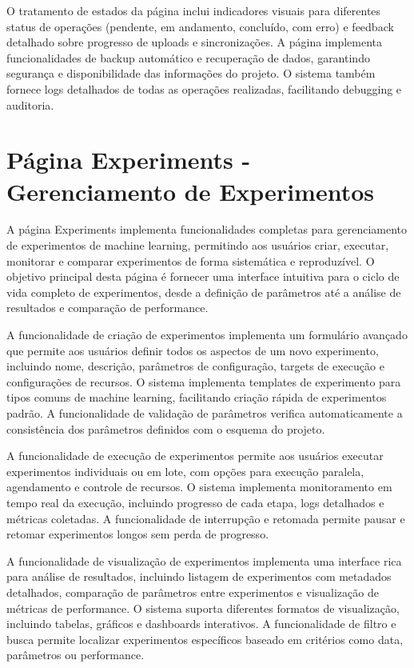 \documentclass[12pt,a4paper]{article}
\begin{document}
O tratamento de estados da página inclui indicadores visuais para diferentes status de operações (pendente, em andamento, concluído, com erro) e feedback detalhado sobre progresso de uploads e sincronizações. A página implementa funcionalidades de backup automático e recuperação de dados, garantindo segurança e disponibilidade das informações do projeto. O sistema também fornece logs detalhados de todas as operações realizadas, facilitando debugging e auditoria.

\section{Página Experiments - Gerenciamento de Experimentos}

A página Experiments implementa funcionalidades completas para gerenciamento de experimentos de machine learning, permitindo aos usuários criar, executar, monitorar e comparar experimentos de forma sistemática e reproduzível. O objetivo principal desta página é fornecer uma interface intuitiva para o ciclo de vida completo de experimentos, desde a definição de parâmetros até a análise de resultados e comparação de performance.

A funcionalidade de criação de experimentos implementa um formulário avançado que permite aos usuários definir todos os aspectos de um novo experimento, incluindo nome, descrição, parâmetros de configuração, targets de execução e configurações de recursos. O sistema implementa templates de experimento para tipos comuns de machine learning, facilitando criação rápida de experimentos padrão. A funcionalidade de validação de parâmetros verifica automaticamente a consistência dos parâmetros definidos com o esquema do projeto.

A funcionalidade de execução de experimentos permite aos usuários executar experimentos individuais ou em lote, com opções para execução paralela, agendamento e controle de recursos. O sistema implementa monitoramento em tempo real da execução, incluindo progresso de cada etapa, logs detalhados e métricas coletadas. A funcionalidade de interrupção e retomada permite pausar e retomar experimentos longos sem perda de progresso.

A funcionalidade de visualização de experimentos implementa uma interface rica para análise de resultados, incluindo listagem de experimentos com metadados detalhados, comparação de parâmetros entre experimentos e visualização de métricas de performance. O sistema suporta diferentes formatos de visualização, incluindo tabelas, gráficos e dashboards interativos. A funcionalidade de filtro e busca permite localizar experimentos específicos baseado em critérios como data, parâmetros ou performance.
\end{document}
